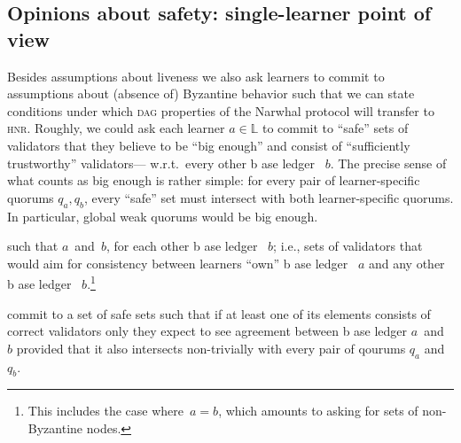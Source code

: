 \documentclass[%
dvipsnames,handout,draft]{article}
\theoremstyle{definition}
\newcommand{\base}[1][ ]{%
  b\ase[#1]%
}
\newcommand{\ase}[1][ ]{%
  ase ledger%
  \ifthenelse{\equal{#1}{ }}{}{#1}\xspace%
}
\newcommand{\Dag}[1][]{\textsc{dag}#1\xspace}
\newcommand{\hnr}{\textsc{hnr}\xspace}
\newcommand{\Lrnrs}{%
  \mathbb{L}
}
\newcommand{\q}[2][]{%
  q#1_{#2}%
}
\begin{document}
\subsection{Opinions about safety: single-learner point of view}
\label{sec:asymmetric-safety}
Besides assumptions about liveness %
we also ask learners to commit to assumptions about (absence of) Byzantine behavior  %
such that we can state conditions under which %
\Dag properties of the Narwhal protocol will transfer to \hnr. %
Roughly, %
we could ask each learner \(a∈\Lrnrs\) %
to commit to ``safe'' sets of validators that they %
believe to be “big enough” and consist of %
“sufficiently trustworthy” validators---%
w.r.t.\ every other \base \(b\).
The precise sense of what counts as big enough is rather simple:
for every pair of learner-specific quorums \(\q{a},\q{b}\), %
every ``safe'' set must intersect with both learner-specific quorums. %
In particular, %
global weak quorums would be big enough. %

 such that 
\(a\) and \(b\), for each other \base \(b\); %
i.e., sets of validators that would aim for consistency between learners “own” \base \(a\) and any other \base \(b\).\footnote{%
  This includes the case where \(a=b\), %
  which amounts to asking for sets of non-Byzantine nodes. %
}

commit to a set of safe sets such that %
if at least one of its elements consists of correct validators only %
they expect to see agreement between \base[s] \(a\) and \(b\) %
provided that it also intersects non-trivially with %
every pair of qourums \(\q{a}\) and \(\q{b}\). %
\end{document}
